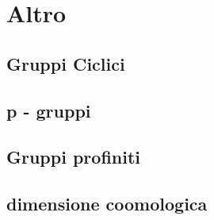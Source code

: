 \chapter{Altro}

\section{Gruppi Ciclici}

\section{p - gruppi}

\section{Gruppi profiniti}

\section{dimensione coomologica}